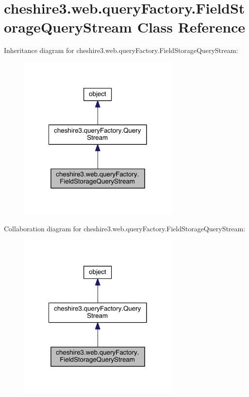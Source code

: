 \hypertarget{classcheshire3_1_1web_1_1query_factory_1_1_field_storage_query_stream}{\section{cheshire3.\-web.\-query\-Factory.\-Field\-Storage\-Query\-Stream Class Reference}
\label{classcheshire3_1_1web_1_1query_factory_1_1_field_storage_query_stream}
}


Inheritance diagram for cheshire3.\-web.\-query\-Factory.\-Field\-Storage\-Query\-Stream\-:
\nopagebreak
\begin{figure}[H]
\begin{center}
\leavevmode
\includegraphics[width=230pt]{classcheshire3_1_1web_1_1query_factory_1_1_field_storage_query_stream__inherit__graph}
\end{center}
\end{figure}


Collaboration diagram for cheshire3.\-web.\-query\-Factory.\-Field\-Storage\-Query\-Stream\-:
\nopagebreak
\begin{figure}[H]
\begin{center}
\leavevmode
\includegraphics[width=230pt]{classcheshire3_1_1web_1_1query_factory_1_1_field_storage_query_stream__coll__graph}
\end{center}
\end{figure}
